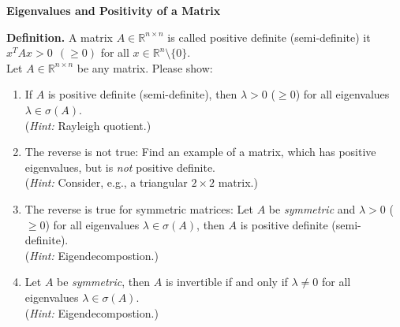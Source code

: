 \textbf{Eigenvalues and Positivity of a Matrix}

{\color{navy}
	\textbf{Definition.} A matrix $A\in \mathbb{R}^{n\times n}$ is called positive definite (semi-definite) it $x^TAx > 0 ~~(\geq 0)$ for all $x \in \mathbb{R}^n\setminus\{0\}$.\\[10pt]}
Let $A\in \mathbb{R}^{n\times n}$ be any matrix. Please show:
\begin{enumerate}
	\item If $A$ is positive definite (semi-definite), then $\lambda > 0$ ($\geq 0$) for all eigenvalues $\lambda \in \sigma(A)$.~\\ (\textit{Hint:} Rayleigh quotient.)
	\item The reverse is not true: Find an example of a matrix, which has positive eigenvalues, but is \textit{not} positive definite.\\
	(\textit{Hint:} Consider, e.g., a triangular $2 \times 2$ matrix.)
	\item The reverse is true for symmetric matrices: Let $A$ be \textit{symmetric} and $\lambda > 0$ ($\geq 0$) for all eigenvalues $\lambda \in \sigma(A)$, then $A$ is positive definite (semi-definite).\\
	(\textit{Hint:} Eigendecompostion.)
	\item Let $A$ be \textit{symmetric}, then $A$ is invertible if and only if $\lambda \neq 0$ for all eigenvalues $\lambda \in \sigma(A)$.~\\ (\textit{Hint:} Eigendecompostion.)
\end{enumerate}

